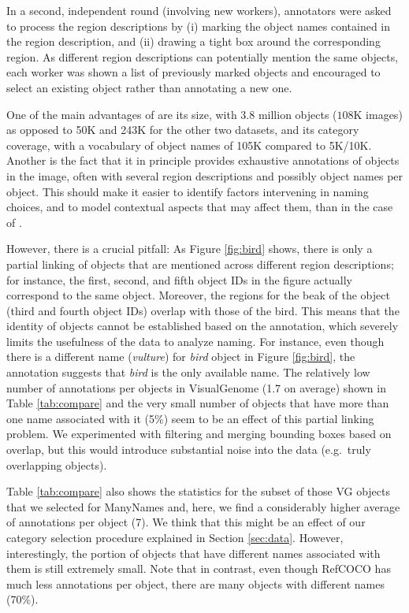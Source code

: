 In a second, independent round (involving new workers), annotators were asked to process the region descriptions by (i) marking the object names contained in the region description, and (ii) drawing a tight box around the corresponding region. As different region descriptions can potentially mention the same objects, each worker was shown a list of previously marked objects and encouraged to select an existing object rather than annotating a new one.


One of the main advantages of \vg are its size, with 3.8 million objects ($108$K images) as opposed to 50K and 243K for the other two datasets, and its category coverage, with a vocabulary of object names of 105K compared to 5K/10K.
Another is the fact that it in principle provides exhaustive annotations of objects in the image, often with several region descriptions and possibly object names per object.
This should make it easier to identify factors intervening in naming choices, and to model contextual aspects that may affect them, than in the case of .

However, there is a crucial pitfall: As Figure \ref{fig:bird} shows, there is only a partial linking of objects that are mentioned across different region descriptions; for instance, the first, second, and fifth object IDs in the figure actually correspond to the same object.
Moreover, the regions for the beak of the object (third and fourth object IDs) overlap with those of the bird.
This means that the identity of objects cannot be established based on the annotation, which severely limits the usefulness of the data to analyze naming.
For instance, even though there is a different name (\textit{vulture}) for \textit{bird} object in Figure \ref{fig:bird}, the annotation suggests that \textit{bird} is the only available name. 
The relatively low number of annotations per objects in VisualGenome (1.7 on average) shown in Table \ref{tab:compare} and the very small number of objects that have more than one name associated with it (5\%) seem to be an effect of this partial linking problem.
We experimented with filtering and merging bounding boxes based on overlap, but this would introduce substantial noise into the data (e.g.\ truly overlapping objects).

Table \ref{tab:compare} also shows the statistics for the subset of those VG objects that we selected for ManyNames and, here, we find a considerably higher average of annotations per object (7). 
We think that this might be an effect of our category selection procedure explained in Section \ref{sec:data}. However, interestingly, the portion of objects that have different names associated with them is still extremely small.
Note that in contrast, even though RefCOCO has much less annotations per object, there are many objects with different names (70\%).


